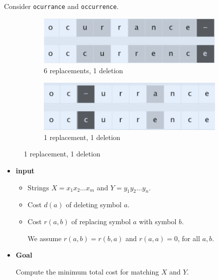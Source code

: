 \begin{example}
    Consider \texttt{ocurrance} and \texttt{occurrence}.

    \begin{figure}[ht!]
        \centering
        \begin{subfigure}[ht!]{0.33\linewidth}
            \centering
            \includegraphics[width=\linewidth]{figures/edit-distance-example-1.png}
            \caption{6 replacements, 1 deletion}
        \end{subfigure}
        \hfil%
        \begin{subfigure}[ht!]{0.33\linewidth}
            \centering
            \includegraphics[width=\linewidth]{figures/edit-distance-example-2.png}
            \caption{1 replacement, 1 deletion}
        \end{subfigure}
    \end{figure}
\end{example}

\begin{itemize}
    \item \textbf{input}

    \begin{itemize}
        \item Strings $X = x_1 x_2 \dots x_m$ and $Y = y_1 y_2 \dots y_n$.
        \item Cost $d(a)$ of deleting symbol $a$.
        \item Cost $r(a, b)$ of replacing symbol $a$ with symbol $b$.
        
        We assume $r(a, b) = r(b, a)$ and $r(a, a) = 0$, for all $a, b$.
    \end{itemize}

    \item \textbf{Goal}

    Compute the minimum total cost for matching $X$ and $Y$.
\end{itemize}

